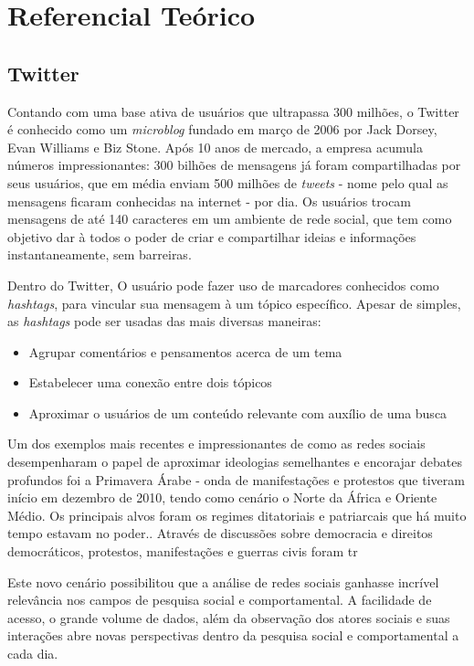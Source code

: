 \chapter{Referencial Teórico}\label{cap:referencial_teorico}

\section{Twitter}\label{sec:twitter}

Contando com uma base ativa de usuários que ultrapassa 300 milhões\cite{twittercompany2016}, o Twitter é conhecido como um \emph{microblog} fundado em março de 2006 por Jack Dorsey, Evan Williams e Biz Stone. Após 10 anos de mercado, a empresa acumula números impressionantes: 300 bilhões de mensagens já foram compartilhadas por seus usuários, que em média enviam 500 milhões de \emph{tweets}\cite{twitterstats2016} - nome pelo qual as mensagens ficaram conhecidas na internet - por dia. Os usuários trocam mensagens de até 140 caracteres\cite{twittercharlimit2016} em um ambiente de rede social, que tem como objetivo dar à todos o poder de criar e compartilhar ideias e informações instantaneamente, sem barreiras\cite{twittercompany2016}. 

Dentro do Twitter, O usuário pode fazer uso de marcadores conhecidos como \emph{hashtags}\cite{waite2012paperback}, para vincular sua mensagem à um tópico específico. Apesar de simples, as \emph{hashtags} pode ser usadas das mais diversas maneiras:
\begin{itemize}
\item Agrupar comentários e pensamentos acerca de um tema
\item Estabelecer uma conexão entre dois tópicos
\item Aproximar o usuários de um conteúdo relevante com auxílio de uma busca
\end{itemize}

Um dos exemplos mais recentes e impressionantes de como as redes sociais desempenharam o papel de aproximar ideologias semelhantes e encorajar debates profundos foi a Primavera Árabe - onda de manifestações e protestos que tiveram início em dezembro de 2010, tendo como cenário o Norte da África e Oriente Médio. Os principais alvos foram os regimes ditatoriais e patriarcais que há muito tempo estavam no poder.\cite{howard2011opening}. Através de discussões sobre democracia e direitos democráticos, protestos, manifestações e guerras civis foram tr

Este novo cenário possibilitou que a análise de redes sociais ganhasse incrível relevância nos campos de pesquisa social e comportamental\cite{wasserman1994advances}. A facilidade de acesso, o grande volume de dados, além da observação dos atores sociais e suas interações abre novas perspectivas dentro da pesquisa social e comportamental a cada dia.

